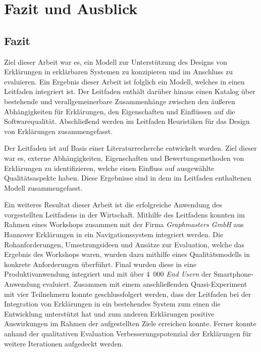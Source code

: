 \chapter{Fazit und Ausblick}

\section{Fazit}

Ziel dieser Arbeit war es, ein Modell zur Unterstützung des Designs von Erklärungen in erklärbaren Systemen zu konzipieren und im Anschluss zu evaluieren. Ein Ergebnis dieser Arbeit ist folglich ein Modell, welches in einen Leitfaden integriert ist. Der Leitfaden enthält darüber hinaus einen Katalog über bestehende und verallgemeinerbare Zusammenhänge zwischen den äußeren Abhängigkeiten für Erklärungen, den Eigenschaften und Einflüssen auf die Softwarequalität. Abschließend werden im Leitfaden Heuristiken für das Design von Erklärungen zusammengefasst.

Der Leitfaden ist auf Basis einer Literaturrecherche entwickelt worden. Ziel dieser war es, externe Abhängigkeiten, Eigenschaften und Bewertungsmethoden von Erklärungen zu identifizieren, welche einen Einfluss auf ausgewählte Qualitätsaspekte haben. Diese Ergebnisse sind in dem im Leitfaden enthaltenen Modell zusammengefasst.

\smallskip

Ein weiteres Resultat dieser Arbeit ist die erfolgreiche Anwendung des vorgestellten Leitfadens in der Wirtschaft. Mithilfe des Leitfadens konnten im Rahmen eines Workshops zusammen mit der Firma \textit{Graphmasters GmbH} aus Hannover Erklärungen in ein Navigationssystem integriert werden. Die Rohanforderungen, Umsetzungsideen und Ansätze zur Evaluation, welche das Ergebnis des Workshops waren, wurden dazu mithilfe eines Qualitätsmodells in konkrete Anforderungen überführt. Final wurden diese in eine Produktivanwendung integriert und mit über 4~000 \textit{End Usern} der Smartphone-Anwendung evaluiert. Zusammen mit einem anschließenden Quasi-Experiment mit vier Teilnehmern konnte geschlussfolgert werden, dass der Leitfaden bei der Integration von Erklärungen in ein bestehendes System zum einen die Entwicklung unterstützt hat und zum anderen Erklärungen positive Auswirkungen im Rahmen der aufgestellten Ziele erreichen konnte. Ferner konnte anhand der qualitativen Evaluation Verbesserungspotenzial der Erklärungen für weitere Iterationen aufgedeckt werden.

\smallskip

